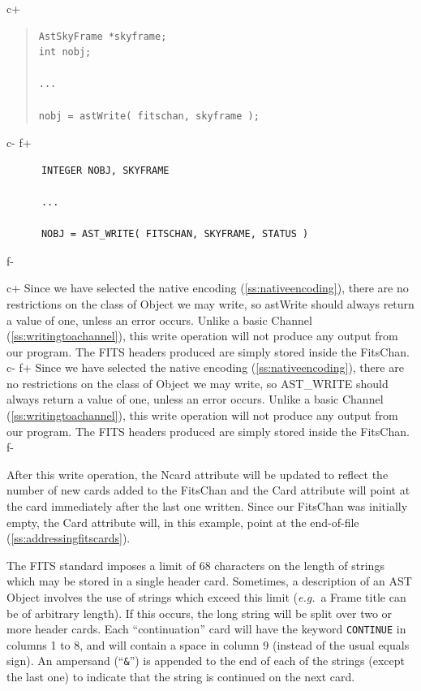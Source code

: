 \documentclass[twoside,11pt]{article}
\newcommand{\secref}[1]{\S\ref{#1}}
\renewcommand{\secref}[1]{\ref{#1}}
\begin{document}
c+
\begin{quote}
\small
\begin{verbatim}
AstSkyFrame *skyframe;
int nobj;

...

nobj = astWrite( fitschan, skyframe );
\end{verbatim}
\normalsize
\end{quote}
c-
f+
\small
\begin{verbatim}
      INTEGER NOBJ, SKYFRAME

      ...

      NOBJ = AST_WRITE( FITSCHAN, SKYFRAME, STATUS )
\end{verbatim}
\normalsize
f-

c+
Since we have selected the native encoding
(\secref{ss:nativeencoding}), there are no restrictions on the class
of Object we may write, so astWrite should always return a value of
one, unless an error occurs. Unlike a basic Channel
(\secref{ss:writingtoachannel}), this write operation will not produce
any output from our program. The FITS headers produced are simply
stored inside the FitsChan.
c-
f+
Since we have selected the native encoding
(\secref{ss:nativeencoding}), there are no restrictions on the class
of Object we may write, so AST\_WRITE should always return a value of
one, unless an error occurs. Unlike a basic Channel
(\secref{ss:writingtoachannel}), this write operation will not produce
any output from our program. The FITS headers produced are simply
stored inside the FitsChan.
f-

After this write operation, the Ncard attribute will be updated to
reflect the number of new cards added to the FitsChan and the Card
attribute will point at the card immediately after the last one
written. Since our FitsChan was initially empty, the Card attribute
will, in this example, point at the end-of-file
(\secref{ss:addressingfitscards}).

The FITS standard imposes a limit of 68 characters on the length of
strings which may be stored in a single header card. Sometimes, a
description of an AST Object involves the use of strings which exceed
this limit ({\em{e.g.}}\ a Frame title can be of arbitrary length). If
this occurs, the long string will be split over two or more header cards.
Each ``continuation'' card will have the keyword {\tt CONTINUE} in
columns 1 to 8, and will contain a space in column 9 (instead of the
usual equals sign). An ampersand (``{\tt \&}'') is appended to the end of
each of the strings (except the last one) to indicate that the string is
continued on the next card. 
\end{document}
